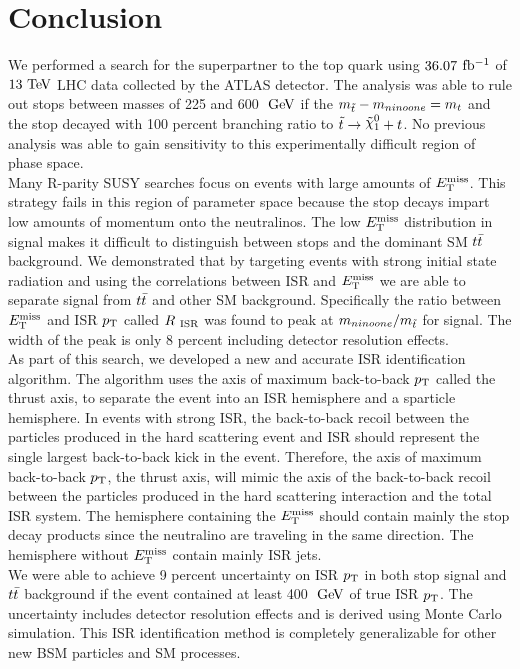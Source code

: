 \chapter{Conclusion}
\label{conclusion}

\indent We performed a search for the superpartner to the top quark using $36.07$ $\mbox{fb$^{-1}$}$ of $13 \tev$ LHC data collected by the ATLAS detector.   The analysis was able to rule out stops between masses of 225 and 600 $\gev$ if the $m_{\tilde{t}} - m_{ninoone} = m_{t}$ and the stop decayed with 100 percent branching ratio to $\stop \rightarrow \ninoone + t$.   No previous analysis was able to gain sensitivity to this experimentally difficult region of phase space.  \\

\indent Many R-parity SUSY searches focus on events with large amounts of $E_{\mathrm{T}}^{\mathrm{miss}}$.  This strategy fails in this region of parameter space because the stop decays impart low amounts of momentum onto the neutralinos.  The low $E_{\mathrm{T}}^{\mathrm{miss}}$ distribution in signal makes it difficult to distinguish between stops and the dominant SM $t\bar{t}$ background.  We demonstrated that by targeting events with strong initial state radiation and using the correlations between ISR and $E_{\mathrm{T}}^{\mathrm{miss}}$ we are able to separate signal from $t\bar{t}$ and other SM background.  Specifically the ratio between $E_{\mathrm{T}}^{\mathrm{miss}}$ and ISR $p_{\mathrm{T}}$ called $R_{~\mathrm{ISR}}$ was found to peak at $m_{ninoone}/m_{\tilde{t}}$ for signal.  The width of the peak is only 8 percent including detector resolution effects.  \\

\indent As part of this search, we developed a new and accurate ISR identification algorithm.  The algorithm uses the axis of maximum back-to-back $p_{\mathrm{T}}$ called the thrust axis, to separate the event into an ISR hemisphere and a sparticle hemisphere.  In events with strong ISR, the back-to-back recoil between the particles produced in the hard scattering event and ISR should represent the single largest back-to-back kick in the event.  Therefore, the axis of maximum back-to-back $p_{\mathrm{T}}$, the thrust axis, will mimic the axis of the back-to-back recoil between the particles produced in the hard scattering interaction and the total ISR system.  The hemisphere containing the $E_{\mathrm{T}}^{\mathrm{miss}}$ should contain mainly the stop decay products since the neutralino are traveling in the same direction.  The hemisphere without $E_{\mathrm{T}}^{\mathrm{miss}}$ contain mainly ISR jets.  \\

\indent We were able to achieve 9 percent uncertainty on ISR $p_{\mathrm{T}}$ in both stop signal and $t\bar{t}$ background if the event contained at least 400 $\gev$ of true ISR $p_{\mathrm{T}}$.  The uncertainty includes detector resolution effects and is derived using Monte Carlo simulation.  This ISR identification method is completely generalizable for other new BSM particles and SM processes.  \\


